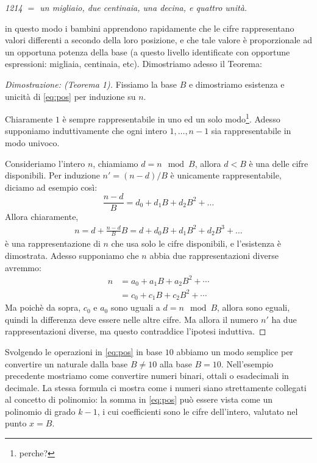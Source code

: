 {\it 1214 $ = $ un migliaio, due centinaia, una decina, e quattro unità.}

\noindent in questo modo i bambini apprendono rapidamente che le cifre
rappresentano valori differenti a secondo della loro posizione, e che tale
valore è proporzionale ad un opportuna potenza della base (a questo livello
identificate con opportune espressioni: migliaia, centinaia, etc).
Dimostriamo adesso il Teorema:

\begin{proof}[Dimostrazione: (Teorema 1)]
Fissiamo la base $B$ e dimostriamo esistenza e unicità di \eqref{eq:pos} per induzione su $n$.

Chiaramente $1$ è sempre rappresentabile in uno ed un solo modo\footnote{perche?}. Adesso supponiamo induttivamente che ogni intero
$1,\ldots,n-1$ sia rappresentabile in modo univoco. 

\noindent Consideriamo l'intero $n$, chiamiamo $d = n \mod B$, allora $d < B$ è una delle cifre disponibili. Per induzione $n' = (n-d)/B$ è unicamente rappresentabile, diciamo ad esempio così:
\[ \frac{n-d}{B} = d_0 + d_1 B + d_2 B^2 + \ldots \]
Allora chiaramente,
\begin{align*}
n = d + \frac{n-d}{B}B = d + d_0 B + d_1 B^2 + d_2 B^3 + \ldots
\end{align*}
è una rappresentazione di $n$ che usa solo le cifre disponibili, e l'esistenza è dimostrata.
Adesso supponiamo che $n$ abbia due rappresentazioni diverse avremmo:
\begin{align*}
n &= a_0 + a_1B + a_2B^2 + \cdots\\
  &= c_0 + c_1B + c_2B^2 + \cdots
\end{align*}
Ma poichè da sopra, $c_0$ e $a_0$ sono uguali a $d = n \mod B$, allora sono eguali, quindi la differenza deve essere nelle altre cifre. Ma allora il numero $n'$ ha due rappresentazioni diverse, ma questo 
contraddice l'ipotesi induttiva.
\end{proof}


Svolgendo le operazioni in \eqref{eq:pos} in base $10$ abbiamo un modo
semplice per convertire un naturale dalla base $B \neq 10$ alla base $B = 10$.
Nell'esempio precedente mostriamo come convertire numeri binari, ottali o
esadecimali in decimale. La stessa formula ci mostra come i numeri siano
strettamente collegati al concetto di polinomio: la somma in \eqref{eq:pos} può essere
vista come un polinomio di grado $k-1$, i cui coefficienti sono le cifre
dell'intero, valutato nel punto $x = B$.


